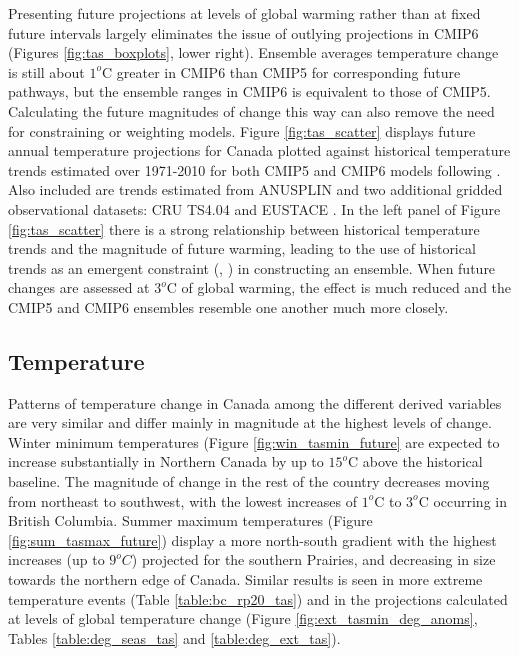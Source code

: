 \documentclass[]{scrartcl}
\begin{document}
Presenting future projections at levels of global warming rather than at fixed future intervals largely eliminates the issue of outlying projections in CMIP6 (Figures \ref{fig:tas_boxplots}, lower right). Ensemble averages temperature change is still about $1^o$C greater in CMIP6 than CMIP5 for corresponding future pathways, but the ensemble ranges in CMIP6 is equivalent to those of CMIP5. Calculating the future magnitudes of change this way can also remove the need for constraining or weighting models. Figure \ref{fig:tas_scatter} displays future annual temperature projections for Canada plotted against historical temperature trends estimated over 1971-2010 for both CMIP5 and CMIP6 models following \cite{Tokarska2020}. Also included are trends estimated from ANUSPLIN and  two additional gridded observational datasets: CRU TS4.04 \citep{Harris2020} and EUSTACE \citep{Brugnara2019}. In the left panel of Figure \ref{fig:tas_scatter} there is a strong relationship between historical temperature trends and the magnitude of future warming, leading to the use of historical trends as an emergent constraint (\citealt{Tokarska2020}, \citealt{Liang2020}) in constructing an ensemble. When future changes are assessed at $3^o$C of global warming, the effect is much reduced and the CMIP5 and CMIP6 ensembles resemble one another much more closely.

\subsection{Temperature}
Patterns of temperature change in Canada among the different derived variables are very similar and differ mainly in magnitude at the highest levels of change. Winter minimum temperatures (Figure \ref{fig:win_tasmin_future} are expected to increase substantially in Northern Canada by up to $15^o$C above the historical baseline. The magnitude of change in the rest of the country decreases moving from northeast to southwest, with the lowest increases of $1^o$C to $3^o$C occurring in British Columbia. Summer maximum temperatures (Figure \ref{fig:sum_tasmax_future}) display a more north-south gradient with the highest increases (up to $9^oC$) projected for the southern Prairies, and decreasing in size towards the northern edge of Canada. Similar results is seen in more extreme temperature events (Table \ref{table:bc_rp20_tas}) and in the projections calculated at levels of global temperature change (Figure \ref{fig:ext_tasmin_deg_anoms}, Tables \ref{table:deg_seas_tas} and \ref{table:deg_ext_tas}). 
\end{document}
